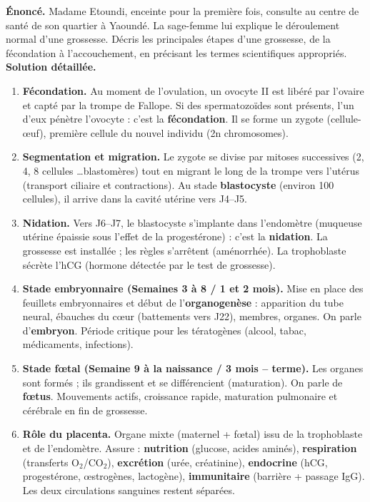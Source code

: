 \documentclass[11pt]{article}
\begin{document}
\begin{exoresolu}
\textbf{Énoncé.} Madame Etoundi, enceinte pour la première fois, consulte au centre de santé de son quartier à Yaoundé. La sage-femme lui explique le déroulement normal d'une grossesse. Décris les principales étapes d'une grossesse, de la fécondation à l'accouchement, en précisant les termes scientifiques appropriés.
\tcblower
\textbf{Solution détaillée.}
\begin{enumerate}
\item \textbf{Fécondation.} Au moment de l'ovulation, un ovocyte II est libéré par l'ovaire et capté par la trompe de Fallope. Si des spermatozoïdes sont présents, l'un d'eux pénètre l'ovocyte : c'est la \textbf{fécondation}. Il se forme un zygote (cellule-\oe uf), première cellule du nouvel individu (2n chromosomes).
\item \textbf{Segmentation et migration.} Le zygote se divise par mitoses successives (2, 4, 8 cellules \dots blastomères) tout en migrant le long de la trompe vers l'utérus (transport ciliaire et contractions). Au stade \textbf{blastocyste} (environ 100 cellules), il arrive dans la cavité utérine vers J4--J5.
\item \textbf{Nidation.} Vers J6--J7, le blastocyste s'implante dans l'endomètre (muqueuse utérine épaissie sous l'effet de la progestérone) : c'est la \textbf{nidation}. La grossesse est installée ; les règles s'arrêtent (aménorrhée). La trophoblaste sécrète l'hCG (hormone détectée par le test de grossesse).
\item \textbf{Stade embryonnaire (Semaines 3 à 8 / 1\ier{} et 2\ieme{} mois).} Mise en place des feuillets embryonnaires et début de l'\textbf{organogenèse} : apparition du tube neural, ébauches du c\oe ur (battements vers J22), membres, organes. On parle d'\textbf{embryon}. Période critique pour les tératogènes (alcool, tabac, médicaments, infections).
\item \textbf{Stade f\oe tal (Semaine 9 à la naissance / 3\ieme{} mois -- terme).} Les organes sont formés ; ils grandissent et se différencient (maturation). On parle de \textbf{f\oe tus}. Mouvements actifs, croissance rapide, maturation pulmonaire et cérébrale en fin de grossesse.
\item \textbf{Rôle du placenta.} Organe mixte (maternel + f\oe tal) issu de la trophoblaste et de l'endomètre. Assure : \textbf{nutrition} (glucose, acides aminés), \textbf{respiration} (transferts O$_2$/CO$_2$), \textbf{excrétion} (urée, créatinine), \textbf{endocrine} (hCG, progestérone, œstrogènes, lactogène), \textbf{immunitaire} (barrière + passage IgG). Les deux circulations sanguines restent séparées.

\end{enumerate}
\end{exoresolu}
\end{document}
